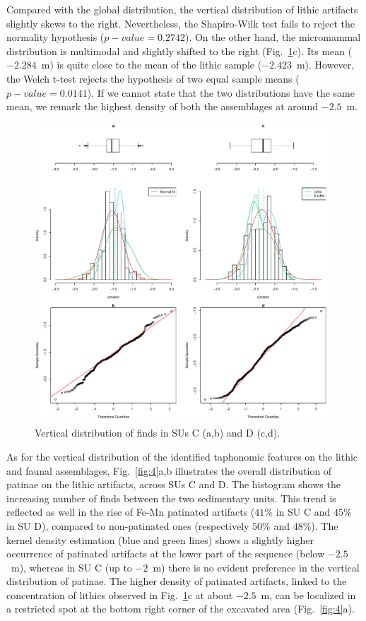 \documentclass[5p,authoryear]{elsarticle} %
\begin{document}
Compared with the global distribution, the vertical distribution of lithic artifacts slightly skews to the right. Nevertheless, the Shapiro-Wilk test fails to reject the normality hypothesis ($p-value=0.2742$). On the other hand, the micromammal distribution is multimodal and slightly shifted to the right (Fig.~\ref{fig:3}c). Its mean ($-2.284$~m) is quite close to the mean of the lithic sample ($-2.423$~m). However, the Welch t-test rejects the hypothesis of two equal sample means ($p-value=0.0141$). If we cannot state that the two distributions have the same mean, we remark the highest density of both the assemblages at around $-2.5$~m.

\begin{figure}[t]
  \centering
  \includegraphics[width=.7\textwidth]{../artwork/Fig3.pdf}
  \caption{Vertical distribution of finds in SUs C (a,b) and D (c,d).}
  \label{fig:3}
\end{figure}

As for the vertical distribution of the identified taphonomic features on the lithic and faunal assemblages, Fig.~\ref{fig:4}a,b illustrates the overall distribution of patinae on the lithic artifacts, across SUs C and D. The histogram shows the increasing number of finds between the two sedimentary units. This trend is reflected as well in the rise of Fe-Mn patinated artifacts ($41\%$ in SU C and $45\%$ in SU D), compared to non-patinated ones (respectively $50\%$ and $48\%$). The kernel density estimation (blue and green lines) shows a slightly higher occurrence of patinated artifacts at the lower part of the sequence (below $-2.5$~m), whereas in SU C (up to $-2$~m) there is no evident preference in the vertical distribution of patinae. The higher density of patinated artifacts, linked to the concentration of lithics observed in Fig.~\ref{fig:3}c at about $-2.5$~m, can be localized in a restricted spot at the bottom right corner of the excavated area (Fig.~\ref{fig:4}a).
\end{document}
